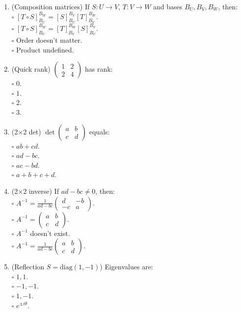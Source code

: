 \documentclass[11pt]{article}
\theoremstyle{upright}
\begin{document}
\begin{enumerate}
\item (Composition matrices) If $S:U\to V$, $T:V\to W$ and bases $B_U,B_V,B_W$, then:\\
\(\square\) $[T\circ S]_{B_U}^{B_W}=[S]_{B_U}^{B_V}[T]_{B_V}^{B_W}$.\\
\(\square\) $[T\circ S]_{B_U}^{B_W}=[T]_{B_V}^{B_W}[S]_{B_U}^{B_V}$.\\
\(\square\) Order doesn’t matter.\\
\(\square\) Product undefined.

\item (Quick rank) $\begin{pmatrix}1&2\\2&4\end{pmatrix}$ has rank:\\
\(\square\) $0$.\\
\(\square\) $1$.\\
\(\square\) $2$.\\
\(\square\) $3$.

\item (2×2 det) $\det\begin{pmatrix}a&b\\c&d\end{pmatrix}$ equals:\\
\(\square\) $ab+cd$.\\
\(\square\) $ad-bc$.\\
\(\square\) $ac-bd$.\\
\(\square\) $a+b+c+d$.

\item (2×2 inverse) If $ad-bc\neq 0$, then:\\
\(\square\) $A^{-1}=\frac{1}{ad-bc}\begin{pmatrix}d&-b\\-c&a\end{pmatrix}$.\\
\(\square\) $A^{-1}=\begin{pmatrix}a&b\\c&d\end{pmatrix}$.\\
\(\square\) $A^{-1}$ doesn’t exist.\\
\(\square\) $A^{-1}=\frac{1}{ad-bc}\begin{pmatrix}a&b\\c&d\end{pmatrix}$.

\item (Reflection $S=\mathrm{diag}(1,-1)$) Eigenvalues are:\\
\(\square\) $1,1$.\\
\(\square\) $-1,-1$.\\
\(\square\) $1,-1$.\\
\(\square\) $e^{\pm i\theta}$.


\end{enumerate}
\end{document}

